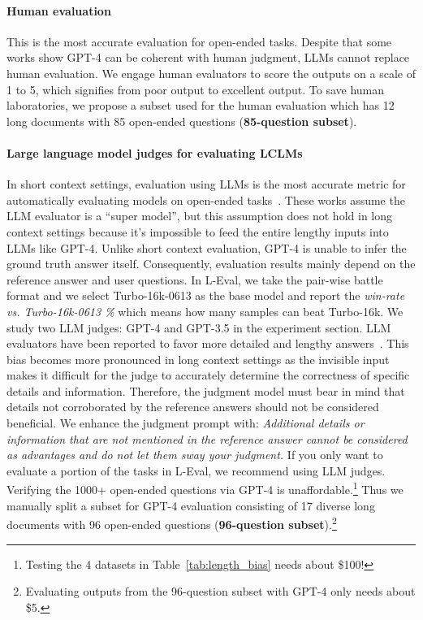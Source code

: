 \vspace{-0.7em}
\paragraph{Human evaluation} This is the most accurate evaluation for open-ended tasks. Despite that some works show GPT-4 can be coherent with human judgment, LLMs cannot replace human evaluation. We engage human evaluators to score the outputs on a scale of 1 to 5, which signifies from poor output to excellent output.
To save human laboratories, we propose a subset used for the human evaluation which has 12 long documents with 85 open-ended questions (\textbf{85-question subset}). 

\vspace{-0.7em}
\paragraph{Large language model judges for evaluating LCLMs}
In short context settings,  evaluation using LLMs is the most accurate metric for automatically evaluating models on open-ended tasks~\citep{zheng2023judging,alpaca_eval, dubois2023alpacafarm}. These works assume the LLM evaluator is a ``super model'', but this assumption does not hold in long context settings because it's impossible to feed the entire lengthy inputs into LLMs like GPT-4. Unlike short context evaluation, GPT-4 is unable to infer the ground truth answer itself. Consequently, evaluation results mainly depend on the reference answer and user questions. In L-Eval, we take the pair-wise battle format and we select Turbo-16k-0613 as the base model and report the \textit{win-rate vs. Turbo-16k-0613 \%} which means how many samples can beat Turbo-16k. We study two LLM judges: GPT-4 and GPT-3.5 in the experiment section.
LLM evaluators have been reported to favor more detailed and lengthy answers~\citep{zheng2023judging}. This bias becomes more pronounced in long context settings as the invisible input makes it difficult for the judge to accurately determine the correctness of specific details and information. Therefore, the judgment model must bear in mind that details not corroborated by the reference answers should not be considered beneficial. We enhance the judgment prompt with: \textit{Additional details or information that are not mentioned in the reference answer cannot be considered as advantages and do not let them sway your judgment.} If you only want to evaluate a portion of the tasks in L-Eval, we recommend using LLM judges.
Verifying the 1000+ open-ended questions via GPT-4 is unaffordable.\footnote{Testing the 4 datasets in Table~\ref{tab:length_bias} needs about \$100!} Thus we manually split a subset for GPT-4 evaluation consisting of 17 diverse long documents with 96 open-ended questions (\textbf{96-question subset}).\footnote{Evaluating outputs from the 96-question subset with GPT-4 only needs about \$5.}

